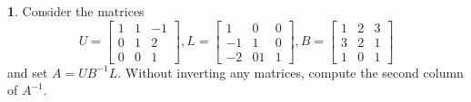 \documentclass{article}
\theoremstyle{definition}
\newtheorem{prob}{}
\begin{document}
\begin{prob}
	Consider the matrices
	\[U=\begin{bmatrix}
		1 & 1 & -1\\
		0 & 1 & 2\\
		0 & 0 & 1
	\end{bmatrix}, 
L=\begin{bmatrix}
	1 & 0& 0\\
	-1 & 1 & 0\\
	-2 & 01& 1
\end{bmatrix}, 
B=\begin{bmatrix}
	1 & 2 & 3\\
	3 & 2 & 1\\
	1 & 0 & 1
\end{bmatrix} \]
and set $A=U B^{-1}L$.
Without inverting any matrices, compute the second column of $A^{-1}$.
\end{prob}
\end{document}
